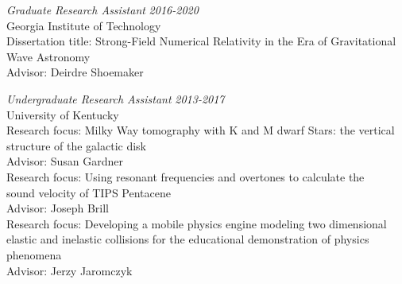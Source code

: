 \documentclass[11pt]{article}
\begin{document}
\begin{flushleft}
  \textit{Graduate Research Assistant} \hfill \textit{2016-2020}\\
  Georgia Institute of Technology\\
  Dissertation title: Strong-Field Numerical Relativity in the Era of Gravitational\\ Wave Astronomy\\
  Advisor: Deirdre Shoemaker\\
  
  \vspace{8px}
	
  \textit{Undergraduate Research Assistant} \hfill \textit{2013-2017}\\
  University of Kentucky\\
  Research focus: Milky Way tomography with K and M dwarf Stars: the vertical\\ structure of the galactic disk\\ 
  Advisor: Susan Gardner\\
  \vspace{2px}
  Research focus: Using resonant frequencies and overtones to calculate the\\ sound velocity of TIPS Pentacene\\
  Advisor: Joseph Brill\\
  \vspace{2px}
  Research focus: Developing a mobile physics engine modeling two dimensional\\ elastic and inelastic collisions for the educational demonstration of physics phenomena\\
  Advisor: Jerzy Jaromczyk\\
  
  \vspace{8px}
	

\end{flushleft}
\end{document}
